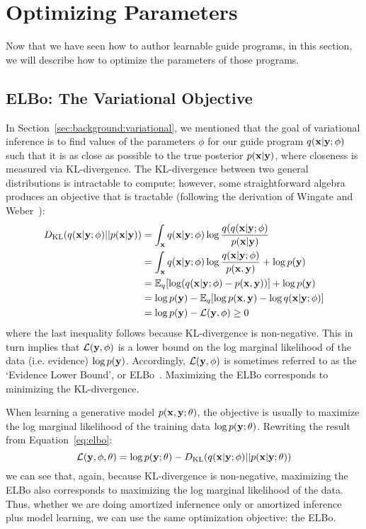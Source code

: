 \section{Optimizing Parameters}
\label{sec:optimization}

Now that we have seen how to author learnable guide programs, in this section, we will describe how to optimize the parameters of those programs. 

\subsection{ELBo: The Variational Objective}

In Section~\ref{sec:background:variational}, we mentioned that the goal of variational inference is to find values of the parameters $\phi$ for our guide program $q(\mathbf{x} | \mathbf{y} ; \phi)$ such that it is as close as possible to the true posterior $p(\mathbf{x} | \mathbf{y})$, where closeness is measured via KL-divergence. The KL-divergence between two general distributions is intractable to compute; however, some straightforward algebra produces an objective that is tractable (following the derivation of Wingate and Weber~\cite{AVIPP}):
\begin{align}
\begin{split}
D_{\text{KL}}(q(\mathbf{x} | \mathbf{y} ; \phi) || p(\mathbf{x} | \mathbf{y}))
&= \int_{\mathbf{x}} q(\mathbf{x} | \mathbf{y} ; \phi) \log \frac{q(q(\mathbf{x} | \mathbf{y} ; \phi)}{p(\mathbf{x} | \mathbf{y})}\\
&= \int_{\mathbf{x}} q(\mathbf{x} | \mathbf{y} ; \phi) \log \frac{q(\mathbf{x} | \mathbf{y} ; \phi)}{p(\mathbf{x}, \mathbf{y})} + \log p(\mathbf{y})\\
&= \mathbb{E}_{q}[ \log(q(\mathbf{x} | \mathbf{y} ; \phi) -  p(\mathbf{x}, \mathbf{y}) ) ] + \log p(\mathbf{y})\\
&= \log p(\mathbf{y}) - \mathbb{E}_{q}[ \log p(\mathbf{x}, \mathbf{y}) - \log q(\mathbf{x} | \mathbf{y} ; \phi) ]\\
&= \log p(\mathbf{y}) - \mathcal{L}(\mathbf{y}, \phi) \geq 0
\end{split}
\label{eq:elbo}
\end{align}
where the last inequality follows because KL-divergence is non-negative. This in turn implies that $\mathcal{L}(\mathbf{y}, \phi)$ is a lower bound on the log marginal likelihood of the data (i.e. evidence) $\log p(\mathbf{y})$. Accordingly, $\mathcal{L}(\mathbf{y}, \phi)$ is sometimes referred to as the `Evidence Lower Bound', or ELBo~\cite{BBVI}. Maximizing the ELBo corresponds to minimizing the KL-divergence.

When learning a generative model $p(\mathbf{x}, \mathbf{y}; \theta)$, the objective is usually to maximize the log marginal likelihood of the training data $\log p(\mathbf{y} ; \theta)$. Rewriting the result from Equation~\ref{eq:elbo}:
\begin{equation*}
\mathcal{L}(\mathbf{y}, \phi, \theta) = \log p(\mathbf{y} ; \theta) - D_{\text{KL}}(q(\mathbf{x} | \mathbf{y} ; \phi) || p(\mathbf{x} | \mathbf{y} ; \theta))
\end{equation*}
we can see that, again, because KL-divergence is non-negative, maximizing the ELBo also corresponds to maximizing the log marginal likelihood of the data. Thus, whether we are doing amortized infernence only or amortized inference plus model learning, we can use the same optimization objective: the ELBo.

